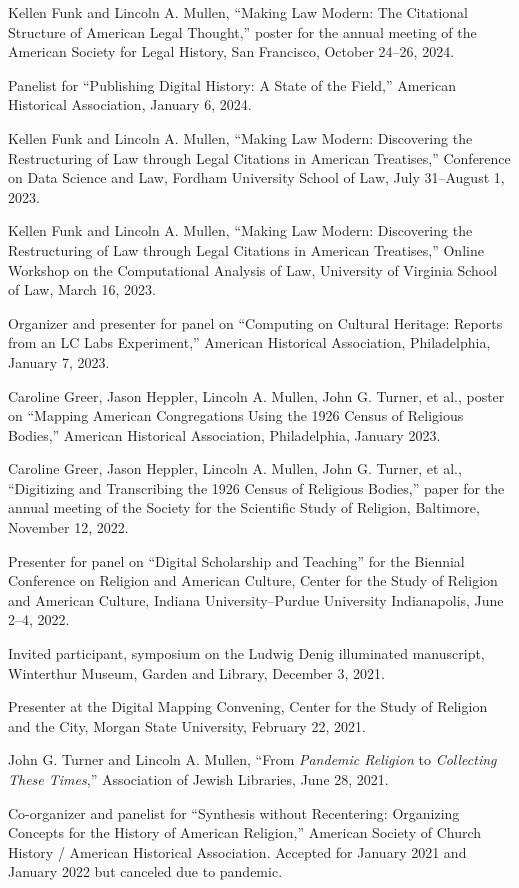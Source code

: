 \documentclass[11pt]{article}
\begin{document}
Kellen Funk and Lincoln A. Mullen, ``Making Law Modern: The Citational Structure of American Legal Thought,'' poster for the annual meeting of the American Society for Legal History, San Francisco, October 24--26, 2024.

Panelist for ``Publishing Digital History: A State of the Field,'' American Historical Association, January 6, 2024.

Kellen Funk and Lincoln A. Mullen, ``Making Law Modern: Discovering the Restructuring of Law through Legal Citations in American Treatises,'' Conference on Data Science and Law, Fordham University School of Law, July 31--August 1, 2023.  

Kellen Funk and Lincoln A. Mullen, ``Making Law Modern: Discovering the Restructuring of Law through Legal Citations in American Treatises,'' Online Workshop on the Computational Analysis of Law, University of Virginia School of Law, March 16, 2023.  

Organizer and presenter for panel on ``Computing on Cultural Heritage: Reports from an LC Labs Experiment,'' American Historical Association, Philadelphia, January 7, 2023.

Caroline Greer, Jason Heppler, Lincoln A. Mullen, John G. Turner, et al., poster on ``Mapping American Congregations Using the 1926 Census of Religious Bodies,'' American Historical Association, Philadelphia, January 2023.

Caroline Greer, Jason Heppler, Lincoln A. Mullen, John G. Turner, et al., ``Digitizing and Transcribing the 1926 Census of Religious Bodies,'' paper for the annual meeting of the Society for the Scientific Study of Religion, Baltimore, November 12, 2022.

Presenter for panel on ``Digital Scholarship and Teaching'' for the Biennial Conference on Religion and American Culture, Center for the Study of Religion and American Culture, Indiana University–Purdue University Indianapolis, June 2--4, 2022.

Invited participant, symposium on the Ludwig Denig illuminated manuscript, Winterthur Museum, Garden and Library, December 3, 2021.

Presenter at the Digital Mapping Convening, Center for the Study of Religion and the City, Morgan State University, February 22, 2021.

John G. Turner and Lincoln A. Mullen, ``From \emph{Pandemic Religion} to \emph{Collecting These Times},'' Association of Jewish Libraries, June 28, 2021.

Co-organizer and panelist for ``Synthesis without Recentering: Organizing Concepts for the History of American Religion,'' American Society of Church History / American Historical Association. Accepted for January 2021 and January 2022 but canceled due to pandemic.
\end{document}
